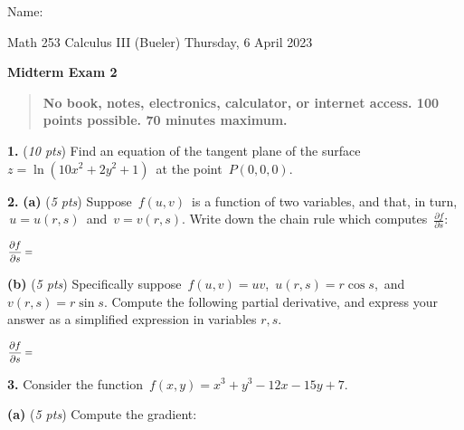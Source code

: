 \documentclass[11pt]{amsart}
\newcommand{\prob}[1]{\bigskip\noindent\textbf{#1.} }
\newcommand{\pts}[1]{(\emph{#1 pts})}
\newcommand{\probpts}[2]{\prob{#1} \pts{#2} \quad}
\newcommand{\ppartpts}[2]{\textbf{(#1)} \pts{#2} \quad}
\newcommand{\epartpts}[2]{\medskip\noindent \textbf{(#1)} \pts{#2} \quad}
\begin{document}
\hfill \Large Name:\underline{\phantom{Ed Bueler really really long long long name}}
\medskip

\scriptsize \noindent Math 253 Calculus III (Bueler) \hfill Thursday, 6 April 2023
\medskip

\LARGE\centerline{\textbf{Midterm Exam 2}}

\smallskip
\begin{quote}
\large
\textbf{No book, notes, electronics, calculator, or internet access.  100 points possible.  70 minutes maximum.}
\end{quote}

\normalsize
\medskip

\thispagestyle{empty}



\probpts{1}{10}  Find an equation of the tangent plane of the surface \,{\large $z = \ln(10 x^2 + 2 y^2 + 1)$}\, at the point \,{\large $P(0,0,0)$}.
\vfill

\prob{2}  \ppartpts{a}{5}   Suppose \,{\large $f(u,v)$}\, is a function of two variables, and that, in turn, \,{\large $u=u(r,s)$}\, and \,{\large $v=v(r,s)$}.  Write down the chain rule which computes \,{\large $\frac{\partial f}{\partial s}$}:

\bigskip
    $$\frac{\partial f}{\partial s} = \hspace{6.0in}$$
\vspace{0.5in}

\epartpts{b}{5}  Specifically suppose \,{\large $f(u,v)=uv$},\, {\large $u(r,s)=r \cos s$},\, and \, {\large $v(r,s)=r \sin s$}.  Compute the following partial derivative, and express your answer as a simplified expression in variables $r,s$.

\bigskip
    $$\frac{\partial f}{\partial s} = \hspace{6.0in}$$
\vspace{1.0in}

\clearpage\newpage
\prob{3}  Consider the function \,{\large $f(x,y) = x^3 + y^3 - 12 x - 15 y + 7$}.

\epartpts{a}{5}  Compute the gradient:
\end{document}
